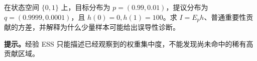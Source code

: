 \documentclass[UTF8,a4paper,11pt,openany]{ctexbook}
\begin{document}
\setcounter{page}{740}
\setcounter{chapter}{31}
\setcounter{figure}{8}
\pagestyle{headings}

\begin{example}[稀有事件下的重要性抽样高方差]
在状态空间 $\{0,1\}$ 上，目标分布为 $p=(0.99,0.01)$，提议分布为 $q=(0.9999,0.0001)$，且 $h(0)=0,h(1)=100$。求 $I=E_p h$、普通重要性贡献的方差，并解释为什么少量样本可能给出误导性诊断。
\end{example}
\textbf{提示。}经验 ESS 只能描述已经观察到的权重集中度，不能发现尚未命中的稀有高贡献区域。
\end{document}
